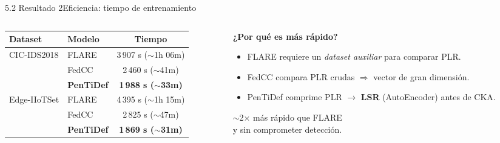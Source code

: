 \begin{frame}{5.2 Resultado 2}{Eficiencia: tiempo de entrenamiento}
  \begin{columns}[T]
    \begin{column}{0.5\textwidth}
      \centering
      \small
      \begin{tabular}{@{}llc@{}}
        \toprule
        \textbf{Dataset} & \textbf{Modelo} & \textbf{Tiempo} \\
        \midrule
        \multirow{3}{*}{CIC-IDS2018}
          & FLARE             & 3\,907 s ($\sim$1h 06m) \\
          & FedCC             & 2\,460 s ($\sim$41m) \\
          & \textbf{PenTiDef} & \textbf{1\,988 s ($\sim$33m)} \\
        \midrule
        \multirow{3}{*}{Edge-IIoTSet}
          & FLARE             & 4\,395 s ($\sim$1h 15m) \\
          & FedCC             & 2\,825 s ($\sim$47m) \\
          & \textbf{PenTiDef} & \textbf{1\,869 s ($\sim$31m)} \\
        \bottomrule
      \end{tabular}
    \end{column}
    \begin{column}{0.48\textwidth}
      \textbf{¿Por qué es más rápido?}\\[0.3em]
      \begin{itemize}\small
        \item FLARE requiere un \textit{dataset auxiliar} para comparar PLR.
        \item FedCC compara PLR crudas $\Rightarrow$ vector de gran dimensión.
        \item PenTiDef comprime PLR $\to$ \textbf{LSR} (AutoEncoder) antes de CKA.
      \end{itemize}
      \vfill
      \begin{exampleblock}{}
        \centering $\sim$2$\times$ más rápido que FLARE \\ y sin comprometer detección.
      \end{exampleblock}
    \end{column}
  \end{columns}
\end{frame}

